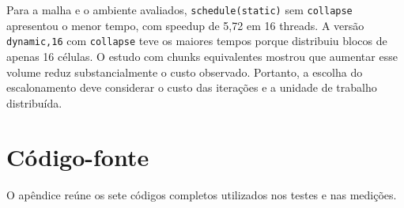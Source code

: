 \documentclass[11pt,letterpaper]{article}
\begin{document}
Para a malha e o ambiente avaliados, \texttt{schedule(static)} sem \texttt{collapse} apresentou o menor tempo, com speedup de 5,72 em 16 threads. A versão \texttt{dynamic,16} com \texttt{collapse} teve os maiores tempos porque distribuiu blocos de apenas 16 células. O estudo com chunks equivalentes mostrou que aumentar esse volume reduz substancialmente o custo observado. Portanto, a escolha do escalonamento deve considerar o custo das iterações e a unidade de trabalho distribuída.

\appendix
\newpage
\section{Código-fonte}
O apêndice reúne os sete códigos completos utilizados nos testes e nas medições.

\newpage

\newpage

\newpage

\newpage

\newpage

\newpage

\end{document}
